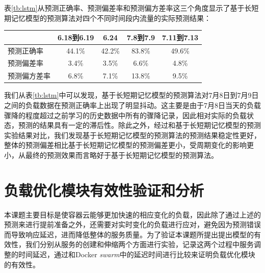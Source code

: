 表\ref{tb:lstm}从预测正确率、预测偏差率和预测偏方差率这三个角度显示了基于长短期记忆模型的预测算法对四个不同时间段内流量的实际预测结果：
\begin{table}[h]
\centering
{}
\begin{tabular}{@{}lcccc@{}}\toprule
  & 6.18到6.19 & 6.24 & 7.8到7.9 & 7.11到7.13 \\ \midrule
 预测正确率 & 44.1\% & 42.2\% & 83.8\% & 49.6\% \\
 预测偏差率 & 3.4\% & 3.5\% & 6.6\% & 4.8\% \\
 预测偏方差率 & 6.8\% & 7.1\% & 13.8\% & 9.5\% \\ \bottomrule
\end{tabular}
\end{table}
我们从表\ref{tb:lstm}中可以发现，基于长短期记忆模型的预测算法对7月8日到7月9日之间的负载数据在预测正确率上出现了明显抖动。这主要是由于7月8日当天的负载骤降的程度超过之前学习的历史数据中所有的骤降记录，因此相对实际的负载状态，预测的结果具有一定的滞后性。除此之外，经过和基于长短期记忆模型的预测实验结果对比，我们发现基于长短期记忆模型的预测算法的预测结果稳定性更好，整体的预测偏差相比基于长短期记忆模型的预测偏差更小，受周期变化的影响更小，从最终的预测效果而言略好于基于长短期记忆模型的预测算法。

\section{负载优化模块有效性验证和分析}
本课题主要目标是使容器云能够更加快速的相应变化的负载，因此除了通过上述的预测来进行提前准备之外，还需要对实时变化的负载进行应对，避免因为预测错误而导致响应延迟，进而降低整体的服务质量。为了验证本课题所提出提出模型的有效性，我们分别从服务的创建和伸缩两个方面进行实验，记录这两个过程中服务调整的时间延迟，通过和Docker \emph{swarm}中的延迟时间进行比较来证明负载优化模块的有效性。

